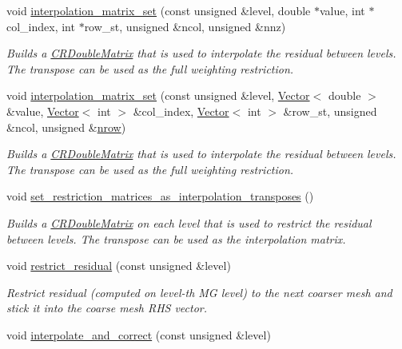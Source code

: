 \begin{DoxyCompactItemize}
void \hyperlink{classoomph_1_1MGSolver_ad749205517822b5855faab5701f90afe}{interpolation\+\_\+matrix\+\_\+set} (const unsigned \&level, double $\ast$value, int $\ast$col\+\_\+index, int $\ast$row\+\_\+st, unsigned \&ncol, unsigned \&nnz)
\begin{DoxyCompactList}\small\item\em Builds a \hyperlink{classoomph_1_1CRDoubleMatrix}{C\+R\+Double\+Matrix} that is used to interpolate the residual between levels. The transpose can be used as the full weighting restriction. \end{DoxyCompactList}\item 
void \hyperlink{classoomph_1_1MGSolver_a7f96b229fb357fdf817f790f92197745}{interpolation\+\_\+matrix\+\_\+set} (const unsigned \&level, \hyperlink{classoomph_1_1Vector}{Vector}$<$ double $>$ \&value, \hyperlink{classoomph_1_1Vector}{Vector}$<$ int $>$ \&col\+\_\+index, \hyperlink{classoomph_1_1Vector}{Vector}$<$ int $>$ \&row\+\_\+st, unsigned \&ncol, unsigned \&\hyperlink{classoomph_1_1DistributableLinearAlgebraObject_a7569556f14fd68b28508920e89bd5eee}{nrow})
\begin{DoxyCompactList}\small\item\em Builds a \hyperlink{classoomph_1_1CRDoubleMatrix}{C\+R\+Double\+Matrix} that is used to interpolate the residual between levels. The transpose can be used as the full weighting restriction. \end{DoxyCompactList}\item 
void \hyperlink{classoomph_1_1MGSolver_a52dcf1e19aa7f5d77697575b341a838b}{set\+\_\+restriction\+\_\+matrices\+\_\+as\+\_\+interpolation\+\_\+transposes} ()
\begin{DoxyCompactList}\small\item\em Builds a \hyperlink{classoomph_1_1CRDoubleMatrix}{C\+R\+Double\+Matrix} on each level that is used to restrict the residual between levels. The transpose can be used as the interpolation matrix. \end{DoxyCompactList}\item 
void \hyperlink{classoomph_1_1MGSolver_a755ee1fd473faa22f342829dadbe4e51}{restrict\+\_\+residual} (const unsigned \&level)
\begin{DoxyCompactList}\small\item\em Restrict residual (computed on level-\/th MG level) to the next coarser mesh and stick it into the coarse mesh R\+HS vector. \end{DoxyCompactList}\item 
void \hyperlink{classoomph_1_1MGSolver_addc29a0b865681c3eaf7d67e702ee995}{interpolate\+\_\+and\+\_\+correct} (const unsigned \&level)

\end{DoxyCompactItemize}
